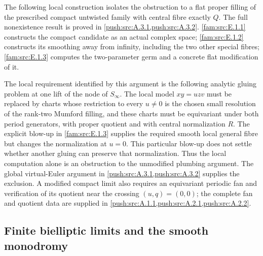 \begin{remark}\label{fam:src:E.1.5}\label{fam:st:E.1.5}
The following local construction isolates the obstruction to a flat proper filling of the prescribed compact untwisted family with central fibre exactly $Q$. The full nonexistence result is proved in \cref{push:src:A.3.1,push:src:A.3.2}. \ref{fam:src:E.1.1} constructs the compact candidate as an actual complex
space; \ref{fam:src:E.1.2} constructs its smoothing away from infinity, including
the two other special fibres; \ref{fam:src:E.1.3} computes the two-parameter germ and a concrete flat modification of it.

The local requirement identified by this argument is the following analytic gluing
problem at one lift of the node of $S_\infty$. The local model
$xy=uzv$ must be replaced by charts whose restriction to every
$u\ne0$ is the chosen small resolution of the rank-two Mumford
filling, and these charts must be equivariant under both period
generators, with proper quotient and with central normalization $R$.
The explicit blow-up in \ref{fam:src:E.1.3} supplies the required smooth local
general fibre but changes the normalization at $u=0$. This particular blow-up does not settle whether another gluing can preserve that normalization. Thus the local computation alone is an obstruction to the unmodified plumbing argument. The global virtual-Euler argument in \cref{push:src:A.3.1,push:src:A.3.2} supplies the exclusion. A modified compact limit
also requires an equivariant periodic fan and verification of its
quotient near the crossing $(u,q)=(0,0)$; the complete fan and quotient data are supplied in \cref{push:src:A.1.1,push:src:A.2.1,push:src:A.2.2}.
\end{remark}


\subsection{Finite bielliptic limits and the smooth monodromy}\label{fam:section:E.2}

